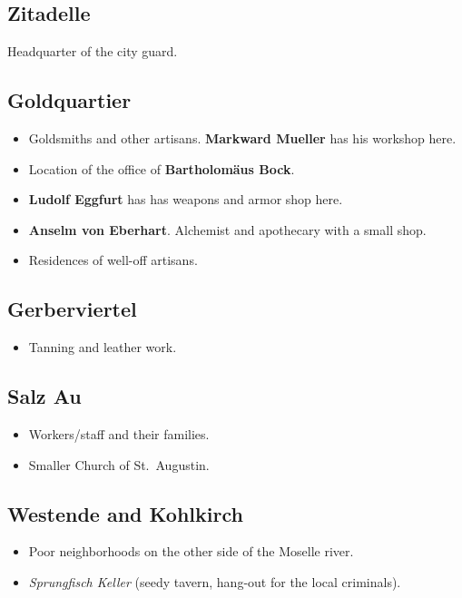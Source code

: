 \documentclass[
]{book}
\providecommand{\tightlist}{%
  \setlength{\itemsep}{0pt}\setlength{\parskip}{0pt}}
\begin{document}
\subsection{Zitadelle}\label{zitadelle}

Headquarter of the city guard.

\subsection{Goldquartier}\label{goldquartier}

\begin{itemize}
\item
  Goldsmiths and other artisans. \textbf{Markward Mueller} has his workshop here.
\item
  Location of the office of \textbf{Bartholomäus Bock}.
\item
  \textbf{Ludolf Eggfurt} has has weapons and armor shop here.
\item
  \textbf{Anselm von Eberhart}. Alchemist and apothecary with a small shop.
\item
  Residences of well-off artisans.
\end{itemize}

\subsection{Gerberviertel}\label{gerberviertel}

\begin{itemize}
\tightlist
\item
  Tanning and leather work.
\end{itemize}

\subsection{Salz Au}\label{salz-au}

\begin{itemize}
\item
  Workers/staff and their families.
\item
  Smaller Church of St.~Augustin.
\end{itemize}

\subsection{Westende and Kohlkirch}\label{westende-and-kohlkirch}

\begin{itemize}
\item
  Poor neighborhoods on the other side of the Moselle river.
\item
  \emph{Sprungfisch Keller} (seedy tavern, hang-out for the local criminals).
\end{itemize}
\end{document}
